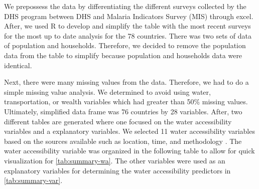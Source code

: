 \documentclass[10pt,twoside]{article}
\numberwithin{equation}{section}
\newcommand{\?}{\stackrel{?}{=}}
\begin{document}
We prepossess the data by differentiating the different surveys collected by the DHS program between DHS and Malaria Indicators Survey (MIS) through excel. After, we used R to develop and simplify the table with the most recent surveys for the most up to date analysis for the 78 countries. There was two sets of data of population and households. Therefore, we decided to remove the population data from the table to simplify because population and households data were identical. 

Next, there were many missing values from the data. Therefore, we had to do a simple missing value analysis. We determined to avoid using water, transportation, or wealth variables which had greater than 50\% missing values. Ultimately, simplified data frame was 76 countries by 28 variables. After, two different tables are generated where one focused on the water accessibility variables and a explanatory variables. We selected 11 water accessibility variables based on the sources available such as location, time, and methodology \citep{price2019difference}. The water accessibility variable was organized
in the following table to allow for quick visualization for \autoref{tab:summary-wa}. The other variables were used as an explanatory variables for determining the water accessibility predictors in \autoref{tab:summary-var}. 
\end{document}

